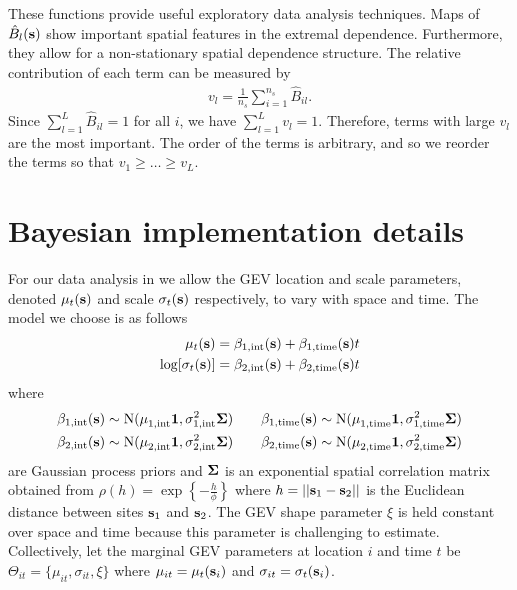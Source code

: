 These functions provide useful exploratory data analysis techniques.
Maps of $\hat{B}_l(\mathbf{s})$ show important spatial features in the extremal dependence.
Furthermore, they allow for a non-stationary spatial dependence structure.
The relative contribution of each term can be measured by
\begin{align} \label{ebeq:v}
v_l = \frac{1}{n_s}\sum_{i=1}^{n_s}{\hat B}_{il}.
\end{align}
Since $\sum_{l=1}^L{\hat B}_{il}=1$ for all $i$, we have $\sum_{l=1}^Lv_l = 1$.
Therefore, terms with large $v_l$ are the most important.
The order of the terms is arbitrary, and so we reorder the terms so that $v_1\ge \ldots \ge v_L$.

\section{Bayesian implementation details}\label{ebs:MCMC}
For our data analysis in  we allow the GEV location and scale parameters, denoted $\mu_t(\mathbf{s})$ and scale $\sigma_t(\mathbf{s})$ respectively, to vary with space and time.
The model we choose is as follows
\begin{align}\label{ebeq:GPprior}
  \mu_t(\mathbf{s}) &= \beta_{1, \text{int}}(\mathbf{s}) + \beta_{1, \text{time}}(\mathbf{s}) t\\
  \log[\sigma_t(\mathbf{s})] &= \beta_{2, \text{int}}(\mathbf{s}) + \beta_{2, \text{time}}(\mathbf{s}) t
\end{align}
where
\begin{align} \label{ebeq:GPhyper}
  \beta_{1, \text{int}}(\mathbf{s}) &\sim \text{N}(\mu^{\phantom{2}}_{1, \text{int}} \mathbf{1}, \sigma^2_{1, \text{int}} \mathbf{\Sigma}) \quad &\beta_{1, \text{time}}(\mathbf{s}) &\sim \text{N}(\mu^{\phantom{2}}_{1, \text{time}} \mathbf{1}, \sigma^2_{1, \text{time}} \mathbf{\Sigma}) \\
  \beta_{2, \text{int}}(\mathbf{s}) &\sim \text{N}(\mu^{\phantom{2}}_{2, \text{int}} \mathbf{1}, \sigma^2_{2, \text{int}} \mathbf{\Sigma}) \quad &\beta_{2, \text{time}}(\mathbf{s}) &\sim \text{N}(\mu^{\phantom{2}}_{2, \text{time}} \mathbf{1}, \sigma^2_{2, \text{time}} \mathbf{\Sigma}) \nonumber
\end{align}
are Gaussian process priors and $\mathbf{\Sigma}$ is an exponential spatial correlation matrix obtained from \mbox{$\rho(h) = \exp\left\{- \frac{h}{\phi}\right\}$} where $h = ||\mathbf{s}_1 - \mathbf{s}_2||$ is the Euclidean distance between sites $\mathbf{s}_1$ and $\mathbf{s}_2$.
The GEV shape parameter $\xi$ is held constant over space and time because this parameter is challenging to estimate.
Collectively, let the marginal GEV parameters at location $i$ and time $t$ be $\Theta_{it} = \{\mu_{it},\sigma_{it},\xi\}$ where $\mu_{it} = \mu_t(\mathbf{s}_i)$ and $\sigma_{it} = \sigma_t(\mathbf{s}_i)$.

